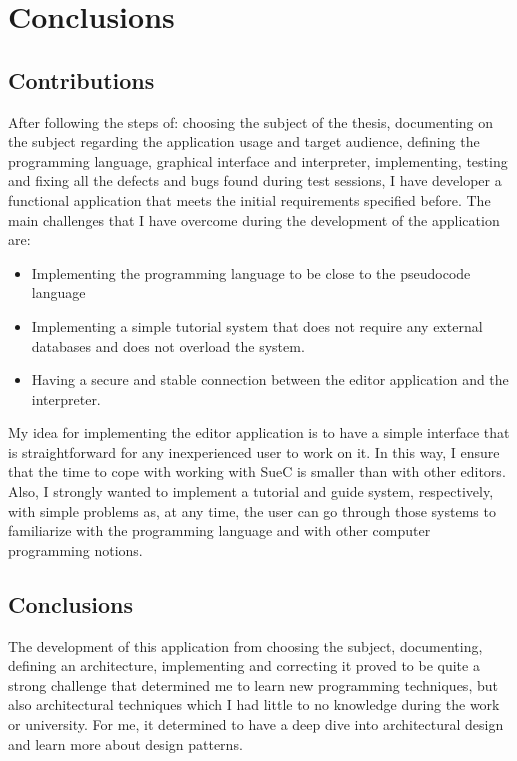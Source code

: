 \documentclass[12pt,a4paper,twoside]{report}
\begin{document}
\chapter{Conclusions}

\section{Contributions}

After following the steps of: choosing the subject of the thesis, documenting on the subject regarding the application usage and target audience, defining the programming language, graphical interface and interpreter, implementing, testing and fixing all the defects and bugs found during test sessions, I have developer a functional application that meets the initial requirements specified before. The main challenges that I have overcome during the development of the application are: 
\begin{itemize}
 \item Implementing the programming language to be close to the pseudocode language
 \item Implementing a simple tutorial system that does not require any external databases and does not overload the system.
 \item Having a secure and stable connection between the editor application and the interpreter.
\end{itemize}

My idea for implementing the editor application is to have a simple interface that is straightforward for any inexperienced user to work on it. In this way, I ensure that the time to cope with working with SueC is smaller than with other editors. Also, I strongly wanted to implement a tutorial and guide system, respectively, with simple problems as, at any time, the user can go through those systems to familiarize with the programming language and with other computer programming notions.

\section{Conclusions}

The development of this application from choosing the subject, documenting, defining an architecture, implementing and correcting it proved to be quite a strong challenge that determined me to learn new programming techniques, but also architectural techniques which I had little to no knowledge during the work or university. For me, it determined to have a deep dive into architectural design and learn more about design patterns.
\end{document}
